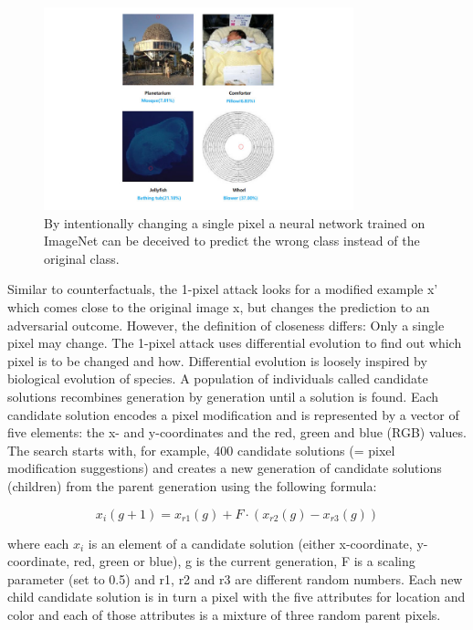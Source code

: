 \documentclass[
  11pt,
]{scrbook}
\begin{document}
\begin{figure}

{\centering \includegraphics[width=0.8\textwidth]{images/adversarial-1pixel} 

}

\caption{By intentionally changing a single pixel a neural network trained on ImageNet can be deceived to predict the wrong class instead of the original class.}\label{fig:adversarial-1pixel}
\end{figure}

Similar to counterfactuals, the 1-pixel attack looks for a modified example x' which comes close to the original image x, but changes the prediction to an adversarial outcome.
However, the definition of closeness differs: Only a single pixel may change.
The 1-pixel attack uses differential evolution to find out which pixel is to be changed and how.
Differential evolution is loosely inspired by biological evolution of species.
A population of individuals called candidate solutions recombines generation by generation until a solution is found.
Each candidate solution encodes a pixel modification and is represented by a vector of five elements: the x- and y-coordinates and the red, green and blue (RGB) values.
The search starts with, for example, 400 candidate solutions (= pixel modification suggestions) and creates a new generation of candidate solutions (children) from the parent generation using the following formula:

\[x_{i}(g+1)=x_{r1}(g)+F\cdot(x_{r2}(g)-x_{r3}(g))\]

where each \(x_i\) is an element of a candidate solution (either x-coordinate, y-coordinate, red, green or blue), g is the current generation, F is a scaling parameter (set to 0.5) and r1, r2 and r3 are different random numbers.
Each new child candidate solution is in turn a pixel with the five attributes for location and color and each of those attributes is a mixture of three random parent pixels.
\end{document}
